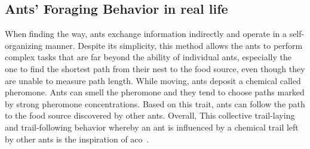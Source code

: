 \subsection{Ants’ Foraging Behavior in real life}
When finding the way, ants exchange information indirectly and operate in a self-organizing manner. Despite its simplicity, this method allows the ants to perform complex tasks that are far beyond the ability of individual ants, especially the one to find the shortest path from their nest to the food source, even though they are unable to measure path length. 
While moving, ants deposit a chemical called pheromone. Ants can smell the pheromone and they tend to choose paths marked by strong pheromone concentrations. Based on this trait, ants can follow the path to the food source discovered by other ants. Overall, This collective trail-laying and trail-following behavior whereby an ant is influenced by a chemical trail left by other ants is the inspiration of \gls{aco}~\cite{parsons2005ant}.

